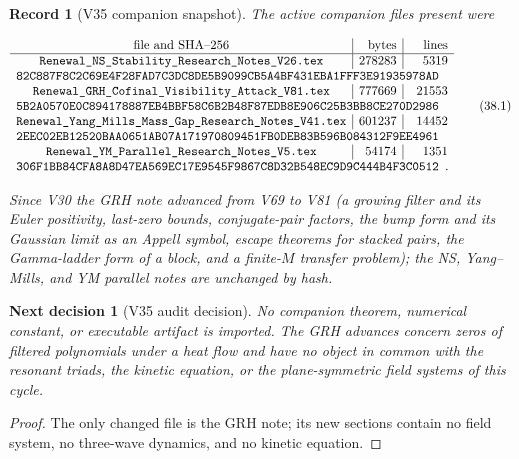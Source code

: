 \documentclass[11pt]{article}
\newtheorem{decision}[theorem]{Next decision}
\newtheorem{record}[theorem]{Record}
\theoremstyle{remark}
\begin{document}
\begin{record}[V35 companion snapshot]
\label{rec:v20v35-snapshot}
The active companion files present were

\[
\begin{array}{c|r|r}
\hbox{file and SHA--256}&\hbox{bytes}&\hbox{lines}\\ \hline
\texttt{Renewal\_NS\_Stability\_Research\_Notes\_V26.tex}
&278283&5319\\
\multicolumn{3}{l}{
\texttt{82C887F8C2C69E4F28FAD7C3DC8DE5B9099CB5A4BF431EBA1FFF3E91935978AD}}
\\
\texttt{Renewal\_GRH\_Cofinal\_Visibility\_Attack\_V81.tex}
&777669&21553\\
\multicolumn{3}{l}{
\texttt{5B2A0570E0C894178887EB4BBF58C6B2B48F87EDB8E906C25B3BB8CE270D2986}}
\\
\texttt{Renewal\_Yang\_Mills\_Mass\_Gap\_Research\_Notes\_V41.tex}
&601237&14452\\
\multicolumn{3}{l}{
\texttt{2EEC02EB12520BAA0651AB07A171970809451FB0DEB83B596B084312F9EE4961}}
\\
\texttt{Renewal\_YM\_Parallel\_Research\_Notes\_V5.tex}
&54174&1351\\
\multicolumn{3}{l}{
\texttt{306F1BB84CFA8A8D47EA569EC17E9545F9867C8D32B548EC9D9C444B4F3C0512}}.
\end{array}                                                     \tag{38.1}
\]

Since V30 the GRH note advanced from V69 to V81 (a growing filter
and its Euler positivity, last-zero bounds, conjugate-pair factors,
the bump form and its Gaussian limit as an Appell symbol, escape
theorems for stacked pairs, the Gamma-ladder form of a block, and a
finite-\(M\) transfer problem); the NS, Yang--Mills, and YM parallel
notes are unchanged by hash.
\end{record}

\begin{decision}[V35 audit decision]
\label{dec:v20v35-audit}
No companion theorem, numerical constant, or executable artifact is
imported.  The GRH advances concern zeros of filtered polynomials
under a heat flow and have no object in common with the resonant
triads, the kinetic equation, or the plane-symmetric field systems
of this cycle.
\end{decision}

\begin{proof}
The only changed file is the GRH note; its new sections contain no
field system, no three-wave dynamics, and no kinetic equation.
\end{proof}
\end{document}
